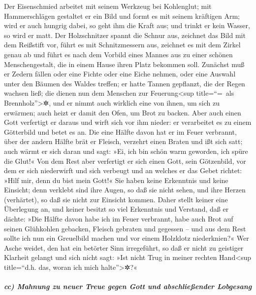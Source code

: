 Der Eisenschmied arbeitet mit seinem Werkzeug bei
Kohlenglut; mit Hammerschlägen gestaltet er ein Bild und formt es mit
seinem kräftigen Arm; wird er auch hungrig dabei, so geht ihm die Kraft
aus; und trinkt er kein Wasser, so wird er matt. Der
Holzschnitzer spannt die Schnur aus, zeichnet das Bild mit dem Reißstift
vor, führt es mit Schnitzmessern aus, zeichnet es mit dem Zirkel genau
ab und führt es nach dem Vorbild eines Mannes aus zu einer schönen
Menschengestalt, die in einem Hause ihren Platz bekommen soll.
Zunächst muß er Zedern fällen oder eine Fichte oder eine
Eiche nehmen, oder eine Auswahl unter den Bäumen des Waldes treffen; er
hatte Tannen gepflanzt, die der Regen wachsen ließ; die
dienen nun dem Menschen zur Feuerung\textless sup title=``=~als
Brennholz''\textgreater✲, und er nimmt auch wirklich eine von ihnen, um
sich zu erwärmen; auch heizt er damit den Ofen, um Brot zu backen. Aber
auch einen Gott verfertigt er daraus und wirft sich vor ihm nieder: er
verarbeitet es zu einem Götterbild und betet es an. Die
eine Hälfte davon hat er im Feuer verbrannt, über der andern Hälfte brät
er Fleisch, verzehrt einen Braten und ißt sich satt; auch wärmt er sich
daran und sagt: »Ei, ich bin schön warm geworden, ich spüre die Glut!«
Von dem Rest aber verfertigt er sich einen Gott, sein
Götzenbild, vor dem er sich niederwirft und sich verbeugt und an welches
er das Gebet richtet: »Hilf mir, denn du bist mein Gott!«
Sie haben keine Erkenntnis und keine Einsicht; denn
verklebt sind ihre Augen, so daß sie nicht sehen, und ihre Herzen
(verhärtet), so daß sie nicht zur Einsicht kommen. Daher
stellt keiner eine Überlegung an, und keiner besitzt so viel Erkenntnis
und Verstand, daß er dächte: »Die Hälfte davon habe ich im Feuer
verbrannt, habe auch Brot auf seinen Glühkohlen gebacken, Fleisch
gebraten und gegessen -- und aus dem Rest sollte ich nun ein Greuelbild
machen und vor einem Holzklotz niederknien?« Wer Asche
weidet, den hat ein betörter Sinn irregeführt, so daß er nicht zu
geistiger Klarheit gelangt und sich nicht sagt: »Ist nicht Trug in
meiner rechten Hand\textless sup title=``d.h. das, woran ich mich
halte''\textgreater✲?«

\hypertarget{cc-mahnung-zu-neuer-treue-gegen-gott-und-abschlieuxdfender-lobgesang}{%
\subparagraph{cc) Mahnung zu neuer Treue gegen Gott und abschließender
Lobgesang}\label{cc-mahnung-zu-neuer-treue-gegen-gott-und-abschlieuxdfender-lobgesang}}

